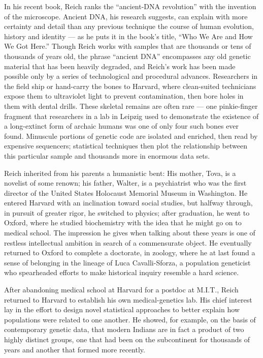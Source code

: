 In his recent book, Reich ranks the ``ancient-DNA revolution'' with the
invention of the microscope. Ancient DNA, his research suggests, can
explain with more certainty and detail than any previous technique the
course of human evolution, history and identity --- as he puts it in the
book's title, ``Who We Are and How We Got Here.'' Though Reich works
with samples that are thousands or tens of thousands of years old, the
phrase ``ancient DNA'' encompasses any old genetic material that has
been heavily degraded, and Reich's work has been made possible only by a
series of technological and procedural advances. Researchers in the
field ship or hand-carry the bones to Harvard, where clean-suited
technicians expose them to ultraviolet light to prevent contamination,
then bore holes in them with dental drills. These skeletal remains are
often rare --- one pinkie-finger fragment that researchers in a lab in
Leipzig used to demonstrate the existence of a long-extinct form of
archaic humans was one of only four such bones ever found. Minuscule
portions of genetic code are isolated and enriched, then read by
expensive sequencers; statistical techniques then plot the relationship
between this particular sample and thousands more in enormous data sets.

Reich inherited from his parents a humanistic bent: His mother, Tova, is
a novelist of some renown; his father, Walter, is a psychiatrist who was
the first director of the United States Holocaust Memorial Museum in
Washington. He entered Harvard with an inclination toward social
studies, but halfway through, in pursuit of greater rigor, he switched
to physics; after graduation, he went to Oxford, where he studied
biochemistry with the idea that he might go on to medical school. The
impression he gives when talking about these years is one of restless
intellectual ambition in search of a commensurate object. He eventually
returned to Oxford to complete a doctorate, in zoology, where he at last
found a sense of belonging in the lineage of Luca Cavalli-Sforza, a
population geneticist who spearheaded efforts to make historical inquiry
resemble a hard science.

After abandoning medical school at Harvard for a postdoc at M.I.T.,
Reich returned to Harvard to establish his own medical-genetics lab. His
chief interest lay in the effort to design novel statistical approaches
to better explain how populations were related to one another. He
showed, for example, on the basis of contemporary genetic data, that
modern Indians are in fact a product of two highly distinct groups, one
that had been on the subcontinent for thousands of years and another
that formed more recently.

